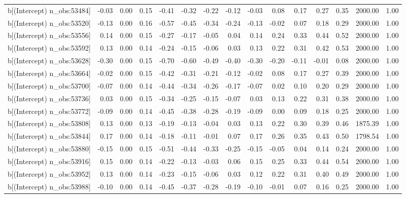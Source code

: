 \begin{table}[ht]
\begin{tabular}{rrrrrrrrrrrrrrr}
  b[(Intercept) n\_obs:53484] & -0.03 & 0.00 & 0.15 & -0.41 & -0.32 & -0.22 & -0.12 & -0.03 & 0.08 & 0.17 & 0.27 & 0.35 & 2000.00 & 1.00 \\ 
  b[(Intercept) n\_obs:53520] & -0.13 & 0.00 & 0.16 & -0.57 & -0.45 & -0.34 & -0.24 & -0.13 & -0.02 & 0.07 & 0.18 & 0.29 & 2000.00 & 1.00 \\ 
  b[(Intercept) n\_obs:53556] & 0.14 & 0.00 & 0.15 & -0.27 & -0.17 & -0.05 & 0.04 & 0.14 & 0.24 & 0.33 & 0.44 & 0.52 & 2000.00 & 1.00 \\ 
  b[(Intercept) n\_obs:53592] & 0.13 & 0.00 & 0.14 & -0.24 & -0.15 & -0.06 & 0.03 & 0.13 & 0.22 & 0.31 & 0.42 & 0.53 & 2000.00 & 1.00 \\ 
  b[(Intercept) n\_obs:53628] & -0.30 & 0.00 & 0.15 & -0.70 & -0.60 & -0.49 & -0.40 & -0.30 & -0.20 & -0.11 & -0.01 & 0.08 & 2000.00 & 1.00 \\ 
  b[(Intercept) n\_obs:53664] & -0.02 & 0.00 & 0.15 & -0.42 & -0.31 & -0.21 & -0.12 & -0.02 & 0.08 & 0.17 & 0.27 & 0.39 & 2000.00 & 1.00 \\ 
  b[(Intercept) n\_obs:53700] & -0.07 & 0.00 & 0.14 & -0.44 & -0.34 & -0.26 & -0.17 & -0.07 & 0.02 & 0.10 & 0.20 & 0.29 & 2000.00 & 1.00 \\ 
  b[(Intercept) n\_obs:53736] & 0.03 & 0.00 & 0.15 & -0.34 & -0.25 & -0.15 & -0.07 & 0.03 & 0.13 & 0.22 & 0.31 & 0.38 & 2000.00 & 1.00 \\ 
  b[(Intercept) n\_obs:53772] & -0.09 & 0.00 & 0.14 & -0.45 & -0.38 & -0.28 & -0.19 & -0.09 & 0.00 & 0.09 & 0.18 & 0.25 & 2000.00 & 1.00 \\ 
  b[(Intercept) n\_obs:53808] & 0.13 & 0.00 & 0.13 & -0.19 & -0.13 & -0.04 & 0.03 & 0.13 & 0.22 & 0.30 & 0.39 & 0.46 & 1875.39 & 1.00 \\ 
  b[(Intercept) n\_obs:53844] & 0.17 & 0.00 & 0.14 & -0.18 & -0.11 & -0.01 & 0.07 & 0.17 & 0.26 & 0.35 & 0.43 & 0.50 & 1798.54 & 1.00 \\ 
  b[(Intercept) n\_obs:53880] & -0.15 & 0.00 & 0.15 & -0.51 & -0.44 & -0.33 & -0.25 & -0.15 & -0.05 & 0.04 & 0.14 & 0.24 & 2000.00 & 1.00 \\ 
  b[(Intercept) n\_obs:53916] & 0.15 & 0.00 & 0.14 & -0.22 & -0.13 & -0.03 & 0.06 & 0.15 & 0.25 & 0.33 & 0.44 & 0.54 & 2000.00 & 1.00 \\ 
  b[(Intercept) n\_obs:53952] & 0.13 & 0.00 & 0.14 & -0.23 & -0.15 & -0.06 & 0.03 & 0.12 & 0.22 & 0.31 & 0.40 & 0.49 & 2000.00 & 1.00 \\ 
  b[(Intercept) n\_obs:53988] & -0.10 & 0.00 & 0.14 & -0.45 & -0.37 & -0.28 & -0.19 & -0.10 & -0.01 & 0.07 & 0.16 & 0.25 & 2000.00 & 1.00 \\ 

\end{tabular}
\end{table}
